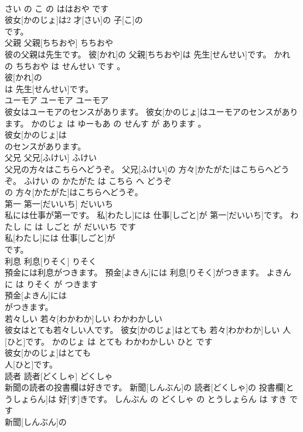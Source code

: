 \documentclass[8pt]{extreport}
\begin{document}
\begin{CJK}{UTF8}{min}
\\	さい の こ の ははおや です	
\\	彼女[かのじょ]は2 才[さい]の 子[こ]の
\\	です。			
\\	父親	父親[ちちおや]	ちちおや	
\\	彼の父親は先生です。	彼[かれ]の 父親[ちちおや]は 先生[せんせい]です。	かれ の ちちおや は せんせい です 。	
\\	彼[かれ]の
\\	は 先生[せんせい]です。			
\\	ユーモア	ユーモア	ユーモア	
\\	彼女はユーモアのセンスがあります。	彼女[かのじょ]はユーモアのセンスがあります。	かのじょ は ゆーもあ の せんす が あります 。	
\\	彼女[かのじょ]は
\\	のセンスがあります。			
\\	父兄	父兄[ふけい]	ふけい	
\\	父兄の方々はこちらへどうぞ。	父兄[ふけい]の 方々[かたがた]はこちらへどうぞ。	ふけい の かたがた は こちら へ どうぞ	
\\	の 方々[かたがた]はこちらへどうぞ。			
\\	第一	第一[だいいち]	だいいち	
\\	私には仕事が第一です。	私[わたし]には 仕事[しごと]が 第一[だいいち]です。	わたし に は しごと が だいいち です	
\\	私[わたし]には 仕事[しごと]が
\\	です。			
\\	利息	利息[りそく]	りそく	
\\	預金には利息がつきます。	預金[よきん]には 利息[りそく]がつきます。	よきん に は りそく が つきます	
\\	預金[よきん]には
\\	がつきます。			
\\	若々しい	若々[わかわか]しい	わかわかしい	
\\	彼女はとても若々しい人です。	彼女[かのじょ]はとても 若々[わかわか]しい 人[ひと]です。	かのじょ は とても わかわかしい ひと です	
\\	彼女[かのじょ]はとても
\\	人[ひと]です。			
\\	読者	読者[どくしゃ]	どくしゃ	
\\	新聞の読者の投書欄は好きです。	新聞[しんぶん]の 読者[どくしゃ]の 投書欄[とうしょらん]は 好[す]きです。	しんぶん の どくしゃ の とうしょらん は すき です	
\\	新聞[しんぶん]の

\end{CJK}
\end{document}
